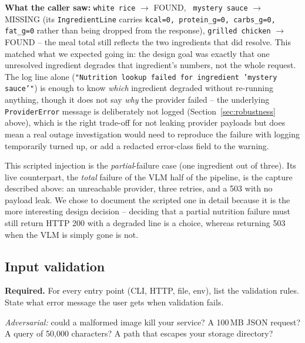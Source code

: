 \documentclass[11pt,a4paper]{article}
\newenvironment{deliverbox}{\begin{deliverboxshown}}{\end{deliverboxshown}}
\newenvironment{probebox}{\begin{probeboxshown}}{\end{probeboxshown}}
\newenvironment{deliverbox}{\setbox0\vbox\bgroup}{\egroup\ignorespacesafterend}
\newenvironment{probebox}{\setbox0\vbox\bgroup}{\egroup\ignorespacesafterend}
\begin{document}
\par\noindent
\textbf{What the caller saw:} \texttt{white rice} $\to$ FOUND, \texttt{
mystery sauce} $\to$ MISSING (its \texttt{IngredientLine} carries
\texttt{kcal=0, protein\_g=0, carbs\_g=0, fat\_g=0} rather than being
dropped from the response), \texttt{grilled chicken} $\to$ FOUND -- the meal
total still reflects the two ingredients that did resolve. This matched
what we expected going in: the design goal was exactly that one unresolved
ingredient degrades that ingredient's numbers, not the whole request. The
log line alone (\texttt{"Nutrition lookup failed for ingredient
'mystery sauce'"}) is enough to know \emph{which} ingredient degraded
without re-running anything, though it does not say \emph{why} the
provider failed -- the underlying \texttt{ProviderError} message is
deliberately not logged (Section~\ref{sec:robustness} above), which is the
right trade-off for not leaking provider payloads but does mean a real
outage investigation would need to reproduce the failure with logging
temporarily turned up, or add a redacted error-class field to the warning.

\par\noindent
This scripted injection is the \emph{partial}-failure case (one ingredient
out of three). Its live counterpart, the \emph{total} failure of the VLM
half of the pipeline, is the capture described above: an unreachable
provider, three retries, and a 503 with no payload leak. We chose to
document the scripted one in detail because it is the more interesting
design decision -- deciding that a partial nutrition failure must still
return HTTP 200 with a degraded line is a choice, whereas returning 503
when the VLM is simply gone is not.

\subsection{Input validation}

\begin{deliverbox}
\textbf{Required.} For every entry point (CLI, HTTP, file, env), list the validation rules. State what error message the user gets when validation fails.
\end{deliverbox}

\begin{probebox}
\textit{Adversarial:} could a malformed image kill your service? A 100\,MB JSON request? A query of 50,000 characters? A path that escapes your storage directory?
\end{probebox}
\end{document}
